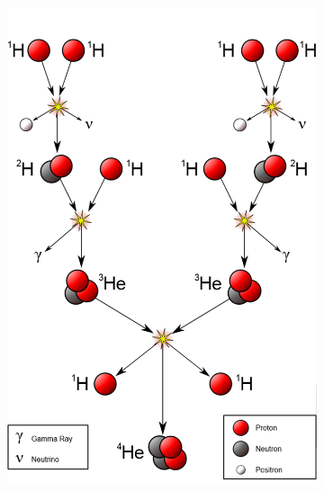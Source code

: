 \documentclass[main.tex]{subfiles}
\begin{document}
    \begin{figure}[th!]
        \centering
        \begin{subfigure}{.5\textwidth}
        \centering
        \includegraphics[scale=0.25]{figures/chapter1/pp-chain.png}
    \end{subfigure}%
    \begin{subfigure}{.5\textwidth}
        \centering

\end{subfigure}
\end{figure}
\end{document}
